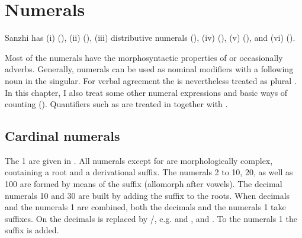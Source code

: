 \chapter{Numerals}
\label{cpt:numerals}

Sanzhi has (i)  (), (ii)  (), (iii) distributive numerals (), (iv)  (), (v)  (), and (vi)  ().

Most of the numerals have the morphosyntactic properties of  or occasionally adverbs. Generally, numerals can be used as nominal modifiers with a following noun in the singular. For verbal agreement the  is nevertheless treated as plural . In this chapter, I also treat some other numeral expressions and basic ways of counting (). Quantifiers such as  are treated in  together with .




\section{Cardinal numerals}
\label{sec:cardinalnumerals}

The  1 are given in . All numerals except for   are morphologically complex, containing a root and a derivational suffix. The numerals 2 to 10, 20, as well as 100 are formed by means of the suffix  (allomorph  after vowels). The decimal numerals 10 and 30 are built by adding the suffix  to the roots. When decimals and the numerals 1 are combined, both the decimals and the numerals 1 take suffixes. On the decimals  is replaced by \slash{}, e.g.   and ,   and . To the numerals 1 the suffix  is added.

